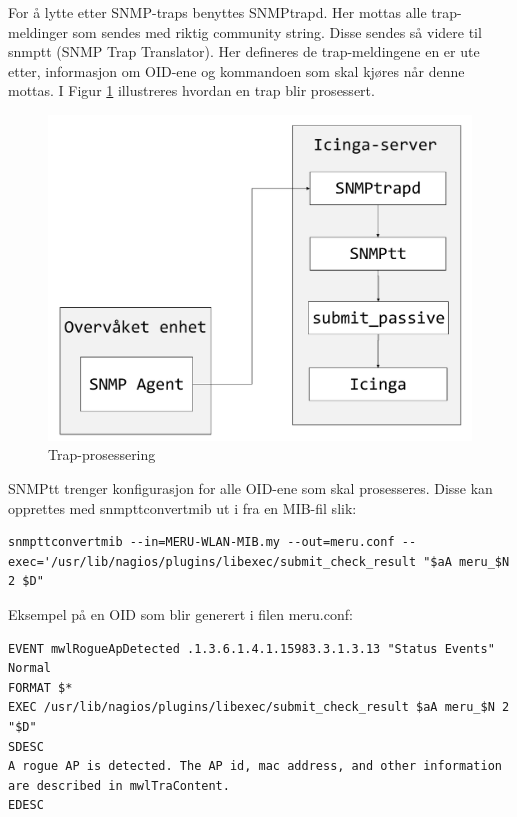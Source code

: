 For å lytte etter SNMP-traps benyttes SNMPtrapd\cite{snmptraps2}. Her mottas alle trap-meldinger som sendes med riktig community string. Disse sendes så videre til snmptt (SNMP Trap Translator\cite{traptranselator}). Her defineres de trap-meldingene en er ute etter, informasjon om OID-ene og kommandoen som skal kjøres når denne mottas. I Figur \ref{snmptrap} illustreres hvordan en trap blir prosessert. 

\begin{figure}[H]
    \centering
    \includegraphics[scale=0.4]{img/SNMPtrap}
    \caption{Trap-prosessering}
    \label{snmptrap}
\end{figure}

SNMPtt trenger konfigurasjon for alle OID-ene som skal prosesseres. Disse kan opprettes med snmpttconvertmib ut i fra en MIB-fil slik:
\begin{lstlisting}[style=example]
snmpttconvertmib --in=MERU-WLAN-MIB.my --out=meru.conf --exec='/usr/lib/nagios/plugins/libexec/submit_check_result "$aA meru_$N 2 $D"
\end{lstlisting}

Eksempel på en OID som blir generert i filen meru.conf:
\begin{lstlisting}[style=example]
EVENT mwlRogueApDetected .1.3.6.1.4.1.15983.3.1.3.13 "Status Events" Normal
FORMAT $*
EXEC /usr/lib/nagios/plugins/libexec/submit_check_result $aA meru_$N 2 "$D"
SDESC
A rogue AP is detected. The AP id, mac address, and other information are described in mwlTraContent.
EDESC
\end{lstlisting}

